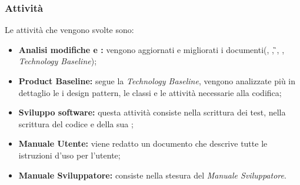\subsubsection{Attività}
Le attività che vengono svolte sono:
\begin{itemize}
	\item \textbf{Analisi modifiche e :} vengono aggiornati e migliorati i documenti(\NdP{}, \PdP{}, \G{}, \PdQ{}, \textit{Technology Baseline});
	\item \textbf{Product Baseline:} segue la \textit{Technology Baseline}, vengono analizzate più in dettaglio le  i design pattern, le classi e le attività necessarie alla codifica;
	\item \textbf{Sviluppo software:} questa attività consiste nella scrittura dei test, nella scrittura del codice e della sua ;
	\item \textbf{Manuale Utente:} viene redatto un documento che descrive tutte le istruzioni d'uso per l'utente;
	\item \textbf{Manuale Sviluppatore:} consiste nella stesura del \textit{Manuale Sviluppatore}.
\end{itemize}

